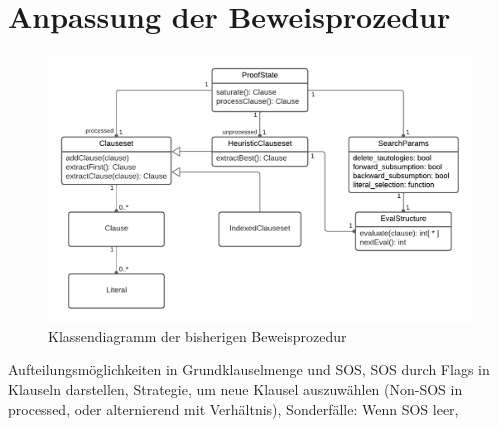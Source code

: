 \section{Anpassung der Beweisprozedur}
\begin{figure}
	\centering
	\includegraphics[width=1\linewidth]{images/Lucid/PyResProofState}
	\caption{Klassendiagramm der bisherigen Beweisprozedur}
	\label{fig:pyresproofstate}
\end{figure}

Aufteilungsmöglichkeiten in Grundklauselmenge und SOS, SOS durch Flags in Klauseln darstellen, Strategie, um neue Klausel auszuwählen (Non-SOS in processed, oder alternierend mit Verhältnis),
Sonderfälle: Wenn SOS leer, 